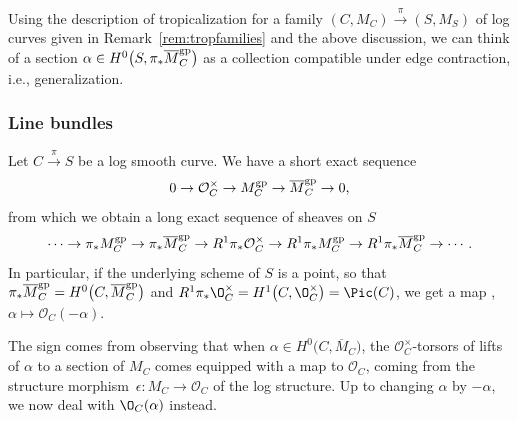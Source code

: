  \begin{remarkk}
 Using the description of tropicalization for a family $(C,M_C)\xrightarrow{\pi}(S,M_S)$ of log curves given in Remark~\ref{rem:tropfamilies} and the above discussion, we can think of a section $ \alpha\in H^0\bigl(S,\pi_*\overline{M}_C^{\rm gp}\bigr)$ as a collection  compatible under edge contraction, i.e., generalization.
 \end{remarkk}



\subsubsection{Line bundles}
Let $C\xrightarrow{\pi} S$ be a log smooth curve. We have a short exact sequence
\begin{equation}\label{eq:logseq}
0\to\mathcal O_C^{\times}\to M_C^{\rm gp}\to\overline{M}_C^{\rm gp}\to 0,\end{equation}
from which we obtain a long exact sequence of sheaves on $S$
\begin{align*}
 \cdots\to \pi_*M_C^{\rm gp}\to\pi_*\overline{M}_C^{\rm gp}\to
 R^1\pi_*\mathcal O_C^{\times}\to
 R^1\pi_*M_C^{\rm gp}\to R^1\pi_*\overline{M}_C^{\rm gp}\to\cdots.
\end{align*}
In particular, if the underlying scheme of $S$ is a point, so that $\pi_*\overline{M}^{\rm gp}_C=H^0\bigl(C,\overline{M}^{\rm gp}_C\bigr)$ and $R^1\pi_*\O_C^\times=H^1\bigl(C,\O_C^\times\bigr)=\Pic(C)$, we get a map
, $
 \alpha \mapsto\mathcal O_C(-\alpha)$.

\begin{remarkk}
 The sign comes from observing that when $\alpha\in H^0\bigl(C,\overline{M}_C\bigr)$, the $\mathcal O_C^{\times}$-torsors of lifts of $\alpha$ to a section of $M_C$ comes equipped with a map to $\mathcal O_C$, coming from the structure morphism~${\epsilon \colon M_C\to\mathcal O_C}$ of the log structure. Up to changing $\alpha$ by $-\alpha$, we now deal with $\O_C(\alpha)$ instead.
\end{remarkk}

